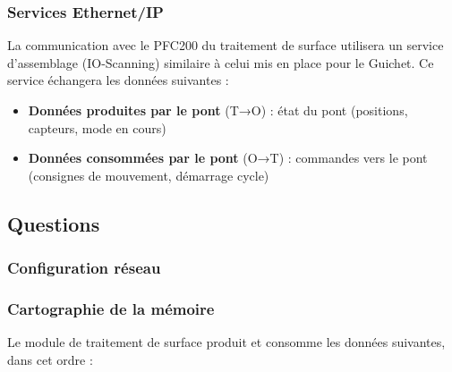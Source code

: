 \subsubsection{Services Ethernet/IP}

La communication avec le PFC200 du traitement de surface utilisera un service d'assemblage (IO-Scanning) similaire à celui mis en place pour le Guichet. Ce service échangera les données suivantes :

\begin{itemize}
    \item \textbf{Données produites par le pont} (T→O) : état du pont (positions, capteurs, mode en cours)
    \item \textbf{Données consommées par le pont} (O→T) : commandes vers le pont (consignes de mouvement, démarrage cycle)
\end{itemize}

\subsection{Questions}

\subsubsection{Configuration réseau}


\subsubsection{Cartographie de la mémoire}

Le module de traitement de surface produit et consomme les données suivantes, dans cet ordre :

